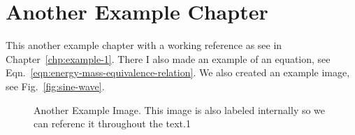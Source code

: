 \documentclass[\main/master.tex]{subfiles}
\begin{document}
\chapter{Another Example Chapter}\label{chp:example-3}
\doublespacing
\hspace{5 mm} This another example chapter with a working reference as see in Chapter~\ref{chp:example-1}. There I also made an example of an equation, see Eqn.~\ref{eqn:energy-mass-equivalence-relation}. We also created an example image, see Fig.~\ref{fig:sine-wave}.
\begin{figure}[htbp]
	\centering
	\caption[Another Example Image1]{Another Example Image. This image is also labeled internally so we can referenc it throughout the text.1}
	\label{fig:cosine-wave1}
\end{figure}
\end{document}
